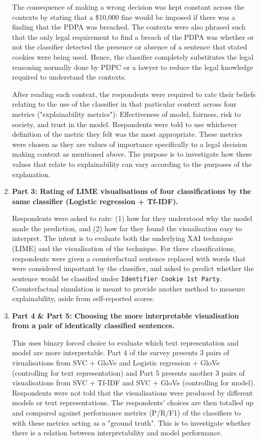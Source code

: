 \begin{enumerate}[listparindent=0.5cm]
	The consequence of making a wrong decision was kept constant across the contexts by stating that a \$10,000 fine would be imposed if there was a finding that the PDPA was breached. The contexts were also phrased such that the only legal requirement to find a breach of the PDPA was whether or not the classifier detected the presence or absence of a sentence that stated cookies were being used. Hence, the classifier completely substitutes the legal reasoning normally done by PDPC or a lawyer to reduce the legal knowledge required to understand the contexts.
	
	After reading each context, the respondents were required to rate their beliefs relating to the use of the classifier in that particular context across four metrics ("explainability metrics"): Effectiveness of model, fairness, risk to society, and trust in the model. Respondents were told to use whichever definition of the metric they felt was the most appropriate. These metrics were chosen as they are values of importance specifically to a legal decision making context as mentioned above. The purpose is to investigate how these values that relate to explainability can vary according to the purposes of the explanation.

	\item \textbf{Part 3: Rating of LIME visualisations of four classifications by the same classifier (Logistic regression + Tf-IDF).} 
	
	Respondents were asked to rate: (1) how far they understood why the model made the prediction, and (2) how far they found the visualisation easy to interpret. The intent is to evaluate both the underlying XAI technique (LIME) and the visualisation of the technique. For three classifications, respondents were given a counterfactual sentence replaced with words that were considered important by the classifier, and asked to predict whether the sentence would be classified under \texttt{Identifier Cookie 1st Party}. Counterfactual simulation is meant to provide another method to measure explainability, aside from self-reported scores.
	
	\item \textbf{Part 4 \& Part 5: Choosing the more interpretable visualisation from a pair of identically classified sentences.} 
	
	This uses binary forced choice to evaluate which text representation and model are more interpretable. Part 4 of the survey presents 3 pairs of visualisations from SVC + GloVe and Logistic regression + GloVe (controlling for text representation) and Part 5 presents another 3 pairs of visualisations from SVC + Tf-IDF and SVC + GloVe (controlling for model). Respondents were not told that the visualisations were produced by different models or text representations. The respondents' choices are then totalled up and compared against performance metrics (P/R/F1) of the classifiers to with these metrics acting as a "ground truth". This is to investigate whether there is a relation between interpretability and model performance.
	

\end{enumerate}
